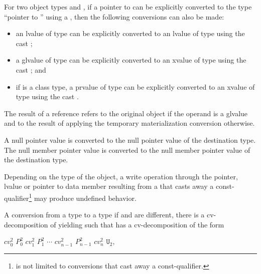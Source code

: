 \pnum
For two object types  and , if a pointer to  can
be explicitly converted to the type ``pointer to '' using a
, then the following conversions can also be made:

\begin{itemize}
\item an lvalue of type  can be explicitly converted to an lvalue
of type  using the cast ;

\item a glvalue of type  can be explicitly converted to an xvalue
of type  using the cast ; and

\item if  is a class type, a prvalue of type  can be
explicitly converted to an xvalue of type  using the cast
.
\end{itemize}

The result of a reference  refers
to the original object if the operand is a glvalue and
to the result of applying the temporary materialization conversion otherwise.

\pnum
A null pointer value is converted to the null pointer
value of the destination type. The null member pointer
value is converted to the null member pointer value of
the destination type.

\pnum
\begin{note}
Depending on the type of the object, a write operation through the
pointer, lvalue or pointer to data member resulting from a
 that casts away a const-qualifier\footnote{
is not limited to conversions that cast away a
const-qualifier.}
may produce undefined behavior.
\end{note}

\pnum
{}%
A conversion from a type  to a type 
if  and  are different,
there is a cv-decomposition of 
yielding  such that
 has a cv-decomposition of the form

\begin{indented}
$cv_0^2$ $P_0^2$ $cv_1^2$ $P_1^2$ $\cdots$ $cv_{n-1}^2$ $P_{n-1}^2$ $cv_n^2$ $\mathtt{U}_2$,
\end{indented}

